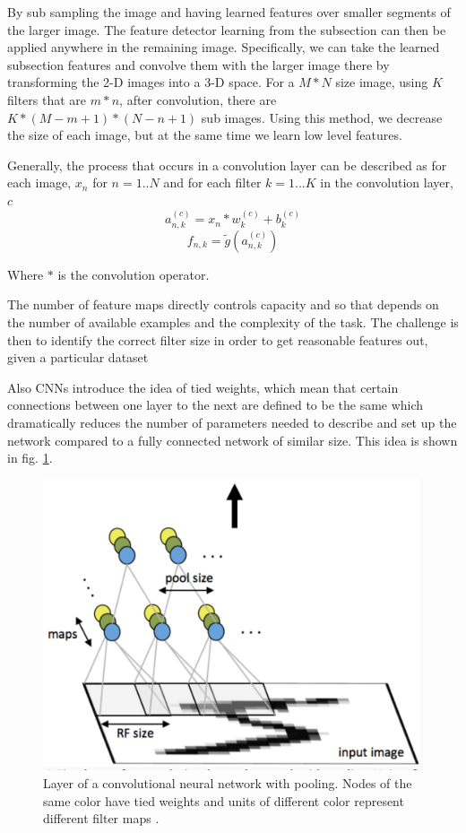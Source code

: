 \documentclass[12pt, twocolumn]{article}
\begin{document}
By sub sampling the image and having learned features over smaller segments of the larger image. The feature detector learning from the subsection can then be applied anywhere in the remaining image. Specifically, we can take the learned subsection features and convolve them with the larger image there by  transforming the 2-D images into a 3-D space. For a  $M * N $ size image, using $K$ filters that are $m * n$,  after convolution, there are  $ K * (M - m + 1) * (N - n + 1) $ sub images. Using this method, we decrease the size of each image, but at the same time we learn low level features. 


Generally, the process that occurs in a convolution layer can be described as for each image, $x_n$ for $n=1..N$ and for each filter $k=1...K$ in the convolution layer, $c$
\begin{equation}
a_{n,k}^{(c)}= x_n \ast w_k^{(c)} + b_k^{(c)}
\end{equation}
\begin{equation}
f_{n,k}= \tilde{g}(a_{n,k}^{(c)})
\end{equation}
 
 Where $\ast$ is the convolution operator. 
 
 The number of feature maps directly controls capacity and so that depends on the number of available examples and the complexity of the task. The challenge is then to identify the correct filter size in order to get reasonable features out, given a particular dataset

Also CNNs introduce the idea of tied weights, which mean that certain connections between one layer to the next are defined to be the same which dramatically reduces the number of parameters needed to describe and set up the network compared to a fully connected network of similar size. This idea is shown in fig. \ref{fig:conv}.



\begin{figure}
\includegraphics[scale=.4]{convgraphic.png}

\caption{Layer of a convolutional neural network with pooling. Nodes of the same color have tied weights and units of different color represent different filter maps \cite{StanfordTut}. }
\label{fig:conv}
\end{figure}
\end{document}
